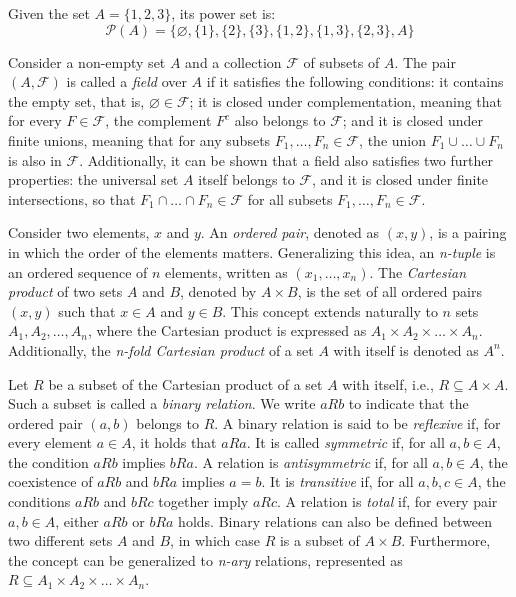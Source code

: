 \begin{example}
Given the set $A = \{1, 2, 3\}$, its power set is:
\[
\mathcal{P}(A) = \{\varnothing, \{1\}, \{2\}, \{3\}, \{1,2\}, \{1,3\}, \{2,3\}, A\}
\]
\end{example}

Consider a non-empty set $A$ and a collection $\mathcal{F}$ of subsets of $A$. The pair $\left( A, \mathcal{F} \right)$ is called a \emph{field} over $A$ if it satisfies the following conditions: it contains the empty set, that is, $\varnothing \in \mathcal{F}$; it is closed under complementation, meaning that for every $F \in \mathcal{F}$, the complement $F^c$ also belongs to $\mathcal{F}$; and it is closed under finite unions, meaning that for any subsets $F_1, \ldots, F_n \in \mathcal{F}$, the union $F_1 \cup \ldots \cup F_n$ is also in $\mathcal{F}$. Additionally, it can be shown that a field also satisfies two further properties: the universal set $A$ itself belongs to $\mathcal{F}$, and it is closed under finite intersections, so that $F_1 \cap \ldots \cap F_n \in \mathcal{F}$ for all subsets $F_1, \ldots, F_n \in \mathcal{F}$.


Consider two elements, $x$ and $y$. An \emph{ordered pair}, denoted as $(x, y)$, is a pairing in which the order of the elements matters. Generalizing this idea, an \emph{n-tuple} is an ordered sequence of $n$ elements, written as $(x_1, \ldots, x_n)$. The \emph{Cartesian product} of two sets $A$ and $B$, denoted by $A \times B$, is the set of all ordered pairs $(x, y)$ such that $x \in A$ and $y \in B$. This concept extends naturally to $n$ sets $A_1, A_2, \dots, A_n$, where the Cartesian product is expressed as $A_1 \times A_2 \times \dots \times A_n$. Additionally, the \emph{n-fold Cartesian product} of a set $A$ with itself is denoted as $A^n$.

Let $R$ be a subset of the Cartesian product of a set $A$ with itself, i.e., $R \subseteq A \times A$. Such a subset is called a \emph{binary relation}. We write $aRb$ to indicate that the ordered pair $(a, b)$ belongs to $R$. A binary relation is said to be \emph{reflexive} if, for every element $a \in A$, it holds that $aRa$. It is called \emph{symmetric} if, for all $a, b \in A$, the condition $aRb$ implies $bRa$. A relation is \emph{antisymmetric} if, for all $a, b \in A$, the coexistence of $aRb$ and $bRa$ implies $a = b$. It is \emph{transitive} if, for all $a, b, c \in A$, the conditions $aRb$ and $bRc$ together imply $aRc$. A relation is \emph{total} if, for every pair $a, b \in A$, either $aRb$ or $bRa$ holds. Binary relations can also be defined between two different sets $A$ and $B$, in which case $R$ is a subset of $A \times B$. Furthermore, the concept can be generalized to \emph{n-ary} relations, represented as $R \subseteq A_1 \times A_2 \times \dots \times A_n$.

